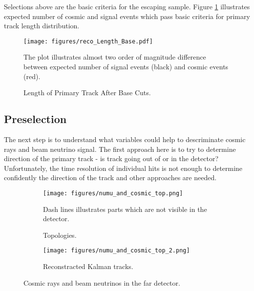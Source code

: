 Selections above are the basic criteria for the escaping sample. Figure \ref{fig:length_1} illustrates 
expected number of cosmic and signal events which pass basic criteria for primary track length distribution.
\begin{figure}[h]
\centering
\texttt{[image: figures/reco\_Length\_Base.pdf]}
\caption{Length of Primary Track After Base Cuts.}
{The plot illustrates almost two order of magnitude difference between expected number of signal events 
(black) and cosmic events (red). }
\label{fig:length_1}
\end{figure}

\subsection{Preselection} \label{presel}
The next step is to understand what variables could help to descriminate cosmic rays and beam neutrino
signal. The first approach here is to try to determine direction of the primary track - is track going 
out of or in the detector? Unfortunately, the time resolution of individual hits is not enough to determine 
confidently the direction of the track and other approaches are needed. 
\begin{figure}[h]
\begin{subfigure}[t]{0.9\textwidth}
  \centering
  \texttt{[image: figures/numu\_and\_cosmic\_top.png]}
  \caption{Topologies.}
  {Dash lines illustrates parts which are not visible in the detector.}
  \label{fig:cosmic_top}
\end{subfigure}
\vspace{0.5cm}
\newline
\begin{subfigure}[t]{0.9\textwidth}
  \centering
  \texttt{[image: figures/numu\_and\_cosmic\_top\_2.png]}
  \caption{Reconstracted Kalman tracks.}
  \label{fig:cosmic_top_2}
\end{subfigure}
\caption{Cosmic rays and beam neutrinos in the far detector.}
\label{fig:top_and_reco_tracks}
\end{figure}

